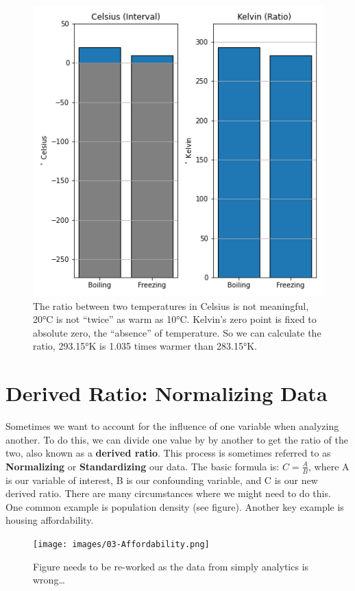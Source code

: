 \documentclass[
]{book}
\begin{document}
\begin{figure}
\centering
\includegraphics{images/03-interval-ratio-temperature.png}
\caption{The ratio between two temperatures in Celsius is not meaningful, 20°C is not ``twice'' as warm as 10°C. Kelvin's zero point is fixed to absolute zero, the ``absence'' of temperature. So we can calculate the ratio, 293.15°K is 1.035 times warmer than 283.15°K.}
\end{figure}

\hypertarget{derived-ratio-normalizing-data}{%
\section{Derived Ratio: Normalizing Data}\label{derived-ratio-normalizing-data}}

Sometimes we want to account for the influence of one variable when analyzing another. To do this, we can divide one value by by another to get the ratio of the two, also known as a \textbf{derived ratio}. This process is sometimes referred to as \textbf{Normalizing} or \textbf{Standardizing} our data. The basic formula is: \(C=\frac{A}{B}\), where A is our variable of interest, B is our confounding variable, and C is our new derived ratio. There are many circumstances where we might need to do this. One common example is population density (see figure). Another key example is housing affordability.

\begin{figure}
\centering
\texttt{[image: images/03-Affordability.png]}
\caption{Figure needs to be re-worked as the data from simply analytics is wrong\ldots{}}
\end{figure}
\end{document}
